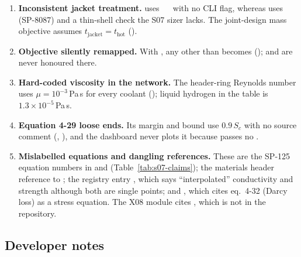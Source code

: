 \begin{enumerate}[label=D\arabic*.]
\item \textbf{Inconsistent jacket treatment.}  uses ~\code{=}~ with no CLI flag, whereas  uses ~\code{=}~ (SP-8087) and a thin-shell check the S07 sizer lacks. The joint-design mass objective assumes $t_{\mathrm{jacket}} = t_{\mathrm{hot}}$ ().
\item \textbf{Objective silently remapped.} With , any  other than  becomes  ();  and  are never honoured there.
\item \textbf{Hard-coded viscosity in the network.} The header-ring Reynolds number uses $\mu = 10^{-3}$\,Pa\,s for every coolant (); liquid hydrogen in the table is $1.3\times10^{-5}$\,Pa\,s.
\item \textbf{Equation 4-29 loose ends.} Its margin and bound use $0.9\,S_c$ with no source comment (, ), and the dashboard never plots it because  passes no .
\item \textbf{Mislabelled equations and dangling references.} These are the SP-125 equation numbers in  and  (Table~\ref{tab:s07-claims}); the materials header reference to ; the registry entry , which says ``interpolated'' conductivity and strength although both are single points; and , which cites eq.\ 4-32 (Darcy loss) as a stress equation. The X08 module  cites , which is not in the repository.
\end{enumerate}


\subsection{Developer notes}\label{sec:s07-dev}

